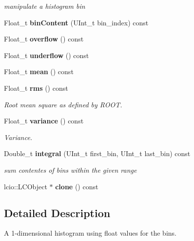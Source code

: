 \begin{DoxyCompactItemize}
\begin{DoxyCompactList}\small\item\em manipulate a histogram bin \item\end{DoxyCompactList}\item 
Float\_\-t {\bfseries binContent} (UInt\_\-t bin\_\-index) const \label{classhistmgr_1_1FloatHistogram1D_a4c772776ba9504a01b41bfdcbc3d4739}

\item 
Float\_\-t {\bfseries overflow} () const \label{classhistmgr_1_1FloatHistogram1D_ac043cc91548219a4ed8b499fa3f213cd}

\item 
Float\_\-t {\bfseries underflow} () const \label{classhistmgr_1_1FloatHistogram1D_a07f92873077aa35c2f8f615595909f8f}

\item 
Float\_\-t {\bfseries mean} () const \label{classhistmgr_1_1FloatHistogram1D_aa62d227b19581c5ad0cb0fa38706c870}

\item 
Float\_\-t {\bf rms} () const 
\begin{DoxyCompactList}\small\item\em Root mean square as defined by ROOT. \item\end{DoxyCompactList}\item 
Float\_\-t {\bf variance} () const 
\begin{DoxyCompactList}\small\item\em Variance. \item\end{DoxyCompactList}\item 
Double\_\-t {\bf integral} (UInt\_\-t first\_\-bin, UInt\_\-t last\_\-bin) const 
\begin{DoxyCompactList}\small\item\em sum contentes of bins within the given range \item\end{DoxyCompactList}\item 
lcio::LCObject $\ast$ {\bfseries clone} () const \label{classhistmgr_1_1FloatHistogram1D_a5edd2500f06f2b1bfd015d9ae4639175}

\end{DoxyCompactItemize}


\subsection{Detailed Description}
A 1-\/dimensional histogram using float values for the bins. 

